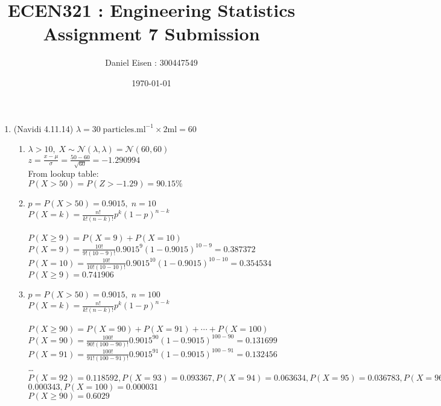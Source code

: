 \documentclass[11pt]{article}
\title{ECEN321 : Engineering Statistics \\ Assignment 7 Submission}
\author{Daniel Eisen : 300447549}
\date{\today}
\begin{document}
\begin{preview}
\maketitle
\begin{enumerate}
\section*{Central Limit Theorem}
\item (Navidi 4.11.14) $\lambda = 30\;\mathrm{particles}.\mathrm{ml}^{-1} \times 2\mathrm{ml} = 60$
\begin{enumerate}
        \item $\lambda > 10,\; X \sim \mathcal{N}(\lambda, \lambda) = \mathcal{N}(60, 60)$ \\
        $z = \frac{x-\mu}{\sigma} = \frac{50-60}{\sqrt{60}}=-1.290994$ \\
        From lookup table:\\
        $P(X>50) = P(Z > -1.29) = 90.15\%$

        \item $p = P(X>50) = 0.9015,\;n=10$ \\
        $P(X = k) = \frac{n!}{k!(n-k)!}p^{k}(1-p)^{n-k}$ \\ \\
        $P(X \ge 9) = P(X=9)+P(X=10)$ \\
        $P(X = 9) = \frac{10!}{9!(10-9)!}0.9015^{9}(1-0.9015)^{10-9} = 0.387372$ \\
        $P(X = 10) = \frac{10!}{10!(10-10)!}0.9015^{10}(1-0.9015)^{10-10} = 0.354534$ \\
        $P(X \ge 9) = 0.741906 $

        \item $p = P(X>50) = 0.9015,\;n=100$ \\
        $P(X = k) = \frac{n!}{k!(n-k)!}p^{k}(1-p)^{n-k}$ \\ \\
        $P(X \ge 90) = P(X=90)+P(X=91)+{\cdots}+P(X=100)$ \\
        $P(X = 90) = \frac{100!}{90!\left(100-90\right)!}0.9015^{90}\left(1-0.9015\right)^{100-90}=0.131699$ \\
        $P(X = 91) = \frac{100!}{91!\left(100-91\right)!}0.9015^{91}\left(1-0.9015\right)^{100-91}=0.132456$ \\
        \dots \\
        $P(X=92)=0.118592, P(X=93)=0.093367, P(X=94)=0.063634, P(X=95)=0.036783, P(X=96)=0.017534, P(X=97)=0.006618, P(X=98)=0.001854, P(X=99)=$$0.000343, P(X=100)=0.000031$ \\
        $P(X \ge 90) = 0.6029$



\end{enumerate}
\end{enumerate}
\end{preview}
\end{document}
